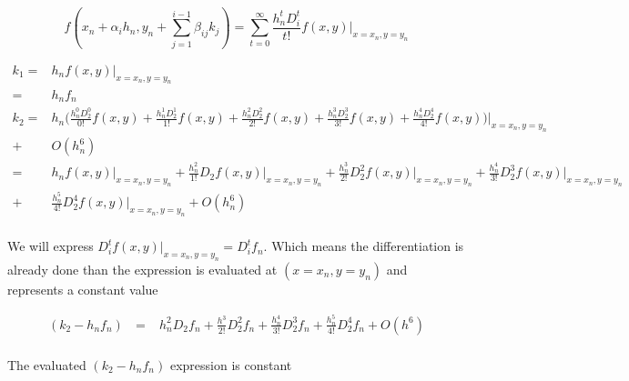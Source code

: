\documentclass[12 pt]{article}
\begin{document}
	{
		\large
		$$f(x_{n}+\alpha_{i}h_{n}, y_{n}+\sum_{j=1}^{i-1}\beta_{ij}k_{j}) = \sum_{t=0}^{\infty}\frac{h_{n}^{t}D^{t}_{i}}{t!}f(x,y)\big\vert_{x = x_{n}, y= y_{n}}$$
	}
	
	{
		\normalsize
		\begin{align*}
			k_{1} =& h_{n}f(x,y)\big\vert_{x = x_{n}, y= y_{n}}\\ 
			=& h_{n}f_{n} \\
			k_{2} =& h_{n}\bigg(\frac{h_{n}^{0}D_{2}^{0}}{0!}f(x,y) + \frac{h_{n}^{1}D_{2}^{1}}{1!}f(x,y) + \frac{h_{n}^{2}D_{2}^{2}}{2!}f(x,y) + \frac{h_{n}^{3}D_{2}^{3}}{3!}f(x,y) + \frac{h_{n}^{4}D_{2}^{4}}{4!}f(x,y)\bigg)\bigg\vert_{x = x_{n}, y= y_{n}}\\ 
			+& O(h_{n}^{6})\\
			=& h_{n}f(x,y)\big\vert_{x = x_{n}, y= y_{n}} + \frac{h_{n}^{2}}{1!}D_{2}f(x,y)\big\vert_{x = x_{n}, y= y_{n}} + \frac{h_{n}^{3}}{2!}D_{2}^{2}f(x,y)\big\vert_{x = x_{n}, y= y_{n}} + \frac{h_{n}^{4}}{3!}D_{2}^{3}f(x,y)\big\vert_{x = x_{n}, y= y_{n}}\\ 
			+& \frac{h_{n}^{5}}{4!}D_{2}^{4}f(x,y)\big\vert_{x = x_{n}, y= y_{n}} + O(h_{n}^{6})\\
		\end{align*}
	}
	
	We will express  $D_{i}^{t}f(x,y)\big\vert_{x = x_{n}, y= y_{n}} = D_{i}^{t}f_{n}$. Which means the differentiation is already done than the expression is evaluated at $(x= x_{n}, y=y_{n})$ and represents a constant value
	
	{
		\large
		\begin{align*}
			(k_{2}-h_{n}f_{n}) \text{ }=&  h_{n}^{2}D_{2}f_{n} + \frac{h^{3}}{2!}D_{2}^{2}f_{n} + \frac{h_{n}^{4}}{3!}D_{2}^{3}f_{n} + \frac{h_{n}^{5}}{4!}D_{2}^{4}f_{n} + O(h^{6})\\
		\end{align*}
	}
	
	The evaluated $(k_{2} - h_{n}f_{n})$ expression is constant
	
\end{document}
